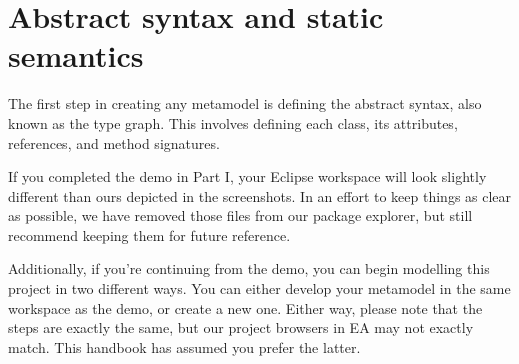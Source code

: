 \newpage
\chapter{Abstract syntax and static semantics}
\genHeader
\label{sec: staticSemantics}

The first step in creating any metamodel is defining the abstract syntax, also known as the type graph. This involves defining each class, its attributes,
references, and method signatures.

If you completed the demo in Part I, your Eclipse workspace will look slightly different than ours depicted in the screenshots.
In an effort to keep things as clear as possible, we have removed those files from our package explorer, but still recommend keeping them for future reference. 

Additionally, if you're continuing from the demo, you can begin modelling this project in two different ways. 
You can either develop your metamodel in the same workspace as the demo, or create a new one.
Either way, please note that the steps are exactly the same, but our project browsers in EA may not exactly match.
This handbook has assumed you prefer the latter.












 
